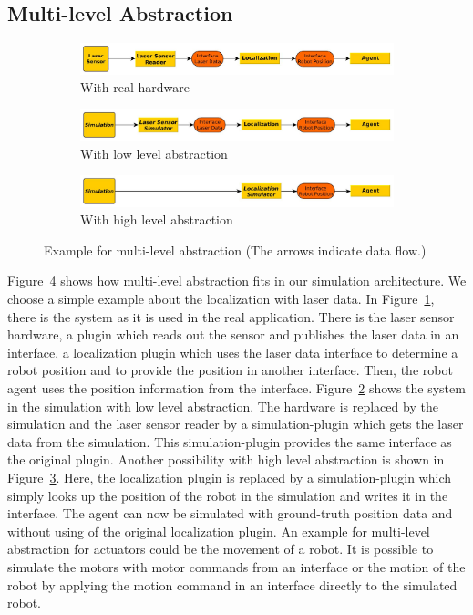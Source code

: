 \subsection{Multi-level Abstraction}
\label{sec:architecture_mla}
\begin{figure}
\centering
\begin{subfigure}[b]{\textwidth}
\includegraphics[width=\textwidth]{tabs/mla_hardware}
\caption{With real hardware}
\label{fig:mla_hardware}
\end{subfigure}
\begin{subfigure}[b]{\textwidth}
\includegraphics[width=\textwidth]{tabs/mla_sim_low}
\caption{With low level abstraction}
\label{fig:mla_sim_low}
\end{subfigure}
\begin{subfigure}[b]{\textwidth}
\includegraphics[width=\textwidth]{tabs/mla_sim_high}
\caption{With high level abstraction}
\label{fig:mla_sim_high}
\end{subfigure}
\caption{Example for multi-level abstraction (The arrows indicate data flow.)}
\label{fig:mla}
\end{figure}
Figure~\ref{fig:mla} shows how multi-level abstraction fits in our simulation architecture. We choose a simple example about the localization with laser data. In Figure~\ref{fig:mla_hardware}, there is the system as it is used in the real application. There is the laser sensor hardware, a plugin which reads out the sensor and publishes the laser data in an interface, a localization plugin which uses the laser data interface to determine a robot position and to provide the position in another interface. Then, the robot agent uses the position information from the interface. Figure~\ref{fig:mla_sim_low} shows the system in the simulation with low level abstraction. The hardware is replaced by the simulation and the laser sensor reader by a simulation-plugin which gets the laser data from the simulation. This simulation-plugin provides the same interface as the original plugin. Another possibility with high level abstraction is shown in Figure~\ref{fig:mla_sim_high}. Here, the localization plugin is replaced by a simulation-plugin which simply looks up the position of the robot in the simulation and writes it in the interface. The agent can now be simulated with ground-truth position data and without using of the original localization plugin. An example for multi-level abstraction for actuators could be the movement of a robot. It is possible to simulate the motors with motor commands from an interface or the motion of the robot by applying the motion command in an interface directly to the simulated robot.
